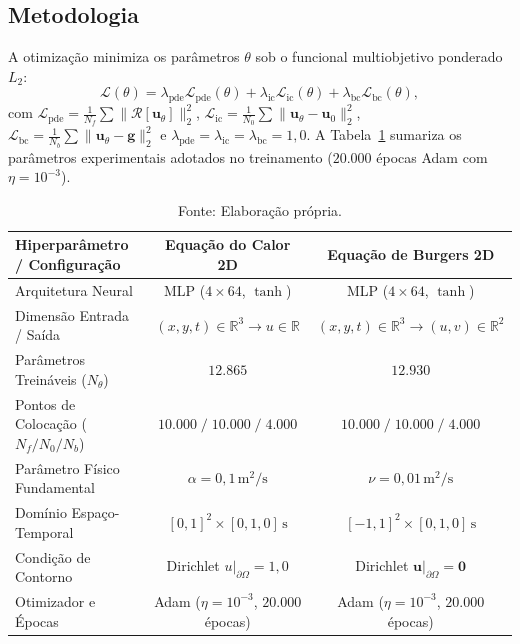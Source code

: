 \documentclass[a4paper, 12pt, twoside]{article}
\begin{document}
\subsection{Metodologia}

A otimização minimiza os parâmetros $\theta$ sob o funcional multiobjetivo ponderado $L_2$:
\begin{equation}
    \mathcal{L}(\theta) = \lambda_{\mathrm{pde}}\mathcal{L}_{\mathrm{pde}}(\theta) + \lambda_{\mathrm{ic}}\mathcal{L}_{\mathrm{ic}}(\theta) + \lambda_{\mathrm{bc}}\mathcal{L}_{\mathrm{bc}}(\theta), \label{eq:loss}
\end{equation}
com $\mathcal{L}_{\mathrm{pde}} = \frac{1}{N_f}\sum \|\mathcal{R}[\mathbf{u}_\theta]\|_2^2$, $\mathcal{L}_{\mathrm{ic}} = \frac{1}{N_0}\sum \|\mathbf{u}_\theta - \mathbf{u}_0\|_2^2$, $\mathcal{L}_{\mathrm{bc}} = \frac{1}{N_b}\sum \|\mathbf{u}_\theta - \mathbf{g}\|_2^2$ e $\lambda_{\mathrm{pde}} = \lambda_{\mathrm{ic}} = \lambda_{\mathrm{bc}} = 1{,}0$. A Tabela~\ref{tab:config} sumariza os parâmetros experimentais adotados no treinamento ($20.000$ épocas Adam com $\eta = 10^{-3}$).

\begin{table}[!ht]
\centering
\caption{Parâmetros experimentais e hiperparâmetros de rede para Calor 2D e Burgers 2D.}
\label{tab:config}
\footnotesize
\setlength{\tabcolsep}{4.5pt}
\begin{tabular}{lcc}
\toprule
\textbf{Hiperparâmetro / Configuração} & \textbf{Equação do Calor 2D} & \textbf{Equação de Burgers 2D} \\
\midrule
Arquitetura Neural & MLP ($4 \times 64$, $\tanh$) & MLP ($4 \times 64$, $\tanh$) \\
Dimensão Entrada / Saída & $(x, y, t) \in \mathbb{R}^3 \to u \in \mathbb{R}$ & $(x, y, t) \in \mathbb{R}^3 \to (u, v) \in \mathbb{R}^2$ \\
Parâmetros Treináveis ($N_\theta$) & $12.865$ & $12.930$ \\
Pontos de Colocação ($N_f / N_0 / N_b$) & $10.000 \;/\; 10.000 \;/\; 4.000$ & $10.000 \;/\; 10.000 \;/\; 4.000$ \\
Parâmetro Físico Fundamental & $\alpha = 0{,}1\,\text{m}^2/\text{s}$ & $\nu = 0{,}01\,\text{m}^2/\text{s}$ \\
Domínio Espaço-Temporal & $[0, 1]^2 \times [0, 1{,}0]\,\text{s}$ & $[-1, 1]^2 \times [0, 1{,}0]\,\text{s}$ \\
Condição de Contorno & Dirichlet $u|_{\partial\Omega} = 1{,}0$ & Dirichlet $\mathbf{u}|_{\partial\Omega} = \mathbf{0}$ \\
Otimizador e Épocas & Adam ($\eta = 10^{-3}$, $20.000$ épocas) & Adam ($\eta = 10^{-3}$, $20.000$ épocas) \\
\bottomrule
\end{tabular}
\caption*{Fonte: Elaboração própria.}
\end{table}
\end{document}
